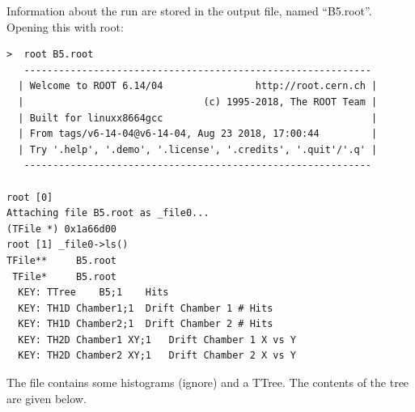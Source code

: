 \documentclass[a4paper,11pt,twoside]{article}
\begin{document}
Information about the run are stored in the output file, named ``B5.root''.
Opening this with root:
\begin{lstlisting}
>  root B5.root
   ------------------------------------------------------------
  | Welcome to ROOT 6.14/04                http://root.cern.ch |
  |                               (c) 1995-2018, The ROOT Team |
  | Built for linuxx8664gcc                                    |
  | From tags/v6-14-04@v6-14-04, Aug 23 2018, 17:00:44         |
  | Try '.help', '.demo', '.license', '.credits', '.quit'/'.q' |
   ------------------------------------------------------------

root [0]
Attaching file B5.root as _file0...
(TFile *) 0x1a66d00
root [1] _file0->ls()
TFile**		B5.root
 TFile*		B5.root
  KEY: TTree	B5;1	Hits
  KEY: TH1D	Chamber1;1	Drift Chamber 1 # Hits
  KEY: TH1D	Chamber2;1	Drift Chamber 2 # Hits
  KEY: TH2D	Chamber1 XY;1	Drift Chamber 1 X vs Y
  KEY: TH2D	Chamber2 XY;1	Drift Chamber 2 X vs Y
\end{lstlisting}

The file contains some histograms (ignore) and a TTree. The contents of the tree are given below.
\end{document}

